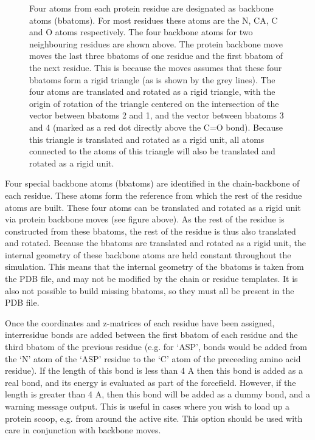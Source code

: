 \documentclass[letterpaper,10pt,english]{sphinxmanual}
\begin{document}
\begin{figure}[htbp]
\centering
\capstart

\noindent{}
\caption{Four atoms from each protein residue are designated as backbone atoms (bbatoms). For most residues these atoms are the N, CA, C and O atoms respectively. The four backbone atoms for two neighbouring residues are shown above. The protein backbone move moves the last three bbatoms of one residue and the first bbatom of the next residue. This is because the moves assumes that these four bbatoms form a rigid triangle (as is shown by the grey lines). The four atoms are translated and rotated as a rigid triangle, with the origin of rotation of the triangle centered on the intersection of the vector between bbatoms 2 and 1, and the vector between bbatoms 3 and 4 (marked as a red dot directly above the C=O bond). Because this triangle is translated and rotated as a rigid unit, all atoms connected to the atoms of this triangle will also be translated and rotated as a rigid unit.}\label{\detokenize{protoms:id2}}\end{figure}

Four special backbone atoms (bbatoms) are identified in the chain-backbone of each residue. These atoms form the reference from which the rest of the residue atoms are built. These four atoms can be translated and rotated as a rigid unit via protein backbone moves (see figure above). As the rest of the residue is constructed from these bbatoms, the rest of the residue is thus also translated and rotated. Because the bbatoms are translated and rotated as a rigid unit, the internal geometry of these backbone atoms are held constant throughout the simulation. This means that the internal geometry of the bbatoms is taken from the PDB file, and may not be modified by the chain or residue templates. It is also not possible to build missing bbatoms, so they must all be present in the PDB file.

Once the coordinates and z-matrices of each residue have been assigned, interresidue bonds are added between the first bbatom of each residue and the third bbatom of the previous residue (e.g. for ‘ASP’, bonds would be added from the ‘N’ atom of the ‘ASP’ residue to the ‘C’ atom of the preceeding amino acid residue). If the length of this bond is less than 4 A then this bond is added as a real bond, and its energy is evaluated as part of the forcefield. However, if the length is greater than 4 A, then this bond will be added as a dummy bond, and a warning message output. This is useful in cases where you wish to load up a protein scoop, e.g. from around the active site. This option should be used with care in conjunction with backbone moves.
\end{document}
